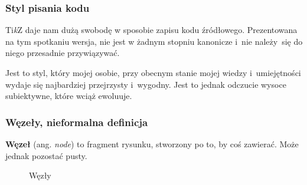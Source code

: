 \documentclass[10pt,t]{beamer}
\begin{document}
\begin{frame}
  \frametitle{Styl pisania kodu}


  Ti\textit{k}Z daje nam dużą swobodę w sposobie zapisu kodu źródłowego.
  Prezentowana na tym spotkaniu wersja, nie jest w żadnym stopniu
  kanonicze i~nie należy~się do niego przesadnie przywiązywać.

  Jest to styl, który mojej osobie, przy obecnym stanie mojej wiedzy
  i~umiejętności wydaje się najbardziej przejrzysty i~wygodny. Jest to
  jednak odczucie wysoce subiektywne, które wciąż ewoluuje.

\end{frame}





\begin{frame}
  \frametitle{Węzeły, nieformalna definicja}


  \textbf{Węzeł} (ang. \textit{node}) to fragment rysunku, stworzony po
  to, by coś zawierać. Może jednak pozostać pusty.





  \begin{figure}

    \centering



    \caption{Węzły}

  \end{figure}

\end{frame}
\end{document}
